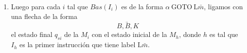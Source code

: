 \begin{frame}
  \begin{enumerate}[2)]
    \item Luego para cada $i$ tal que $Bas(I_{i})$ es de la forma $\alpha \ \mathrm{GOTO} \ \mathrm{L}\bar{m}$, ligamos
      con una flecha de la forma
      \begin{equation*}
        \underrightarrow{\;\;\;\;\;\;B,B,K\;\;\;\;\;\;}
      \end{equation*}
      \PN el estado final $q_{si}$ de la $M_{i}$ con el estado inicial de la $M_{h}$, donde $h$ es tal que $I_{h}$ es la
      primer instrucción que tiene label $\mathrm{L}\bar{m}$.
  \end{enumerate}
\end{frame}
